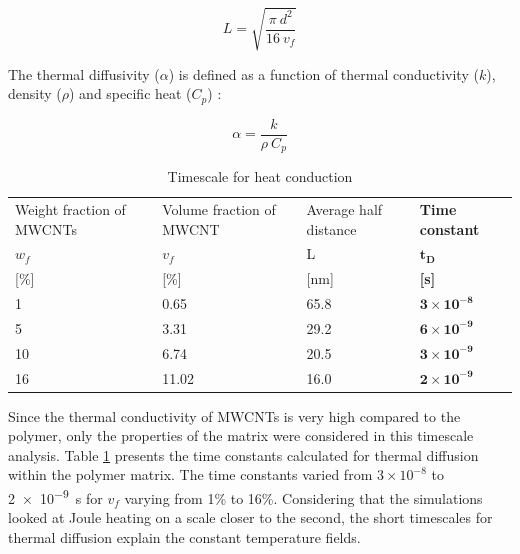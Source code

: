 \documentclass[11pt,review,times]{article}
\begin{document}
\begin{equation}
	L = \sqrt{\frac{\pi \ d^2}{16 \ v_f}}
	\label{equa:L_average}
\end{equation}

The thermal diffusivity ($\alpha$) is defined as a function of thermal conductivity ($k$), density ($\rho$) and specific heat ($C_p$) : 

\begin{equation}
	\alpha = \frac{k}{\rho \ C_p}
	\label{equa:thermal_diffusivity}
\end{equation}

\begin{table}[htb]
\centering
\begin{tabular}{@{}p{2.6cm}p{2.7cm}p{2.2cm}p{1.7cm}@{}}
\toprule
Weight fraction of MWCNTs	& Volume fraction of MWCNT	& Average half distance 	& \textbf{Time constant}  		\\ %
$w_f$								& $v_f$ 							& L 							& $\mathbf{t_D}$            	\\
{[}\%{]}							& {[}\%{]	}						& {[}nm{]} 					& \textbf{{[}s{]}}            	\\ \midrule
1									& 0.65 							& 65.8	 						& $\mathbf{3\times 10^{-8}}$ 	\\ 
5									& 3.31								& 29.2							& $\mathbf{6\times 10^{-9}}$	\\
10									& 6.74								& 20.5							& $\mathbf{3\times 10^{-9}}$	\\
16									& 11.02 							& 16.0 						& $\mathbf{2\times 10^{-9}}$	\\	\bottomrule
\end{tabular}%
\caption{Timescale for heat conduction}
\label{tab:results_timescale}
\end{table}

Since the thermal conductivity of MWCNTs is very high compared to the polymer, only the properties of the matrix were considered in this timescale analysis. 
Table \ref{tab:results_timescale} presents the time constants calculated for thermal diffusion within the polymer matrix. 
The time constants varied from $3 \times 10^{-8}$ to \SI{2e-9}{\second} for $v_f$ varying from 1\% to 16\%. 
Considering that the simulations looked at Joule heating on a scale closer to the second, the short timescales for thermal diffusion explain the constant temperature fields. 

\end{document}
